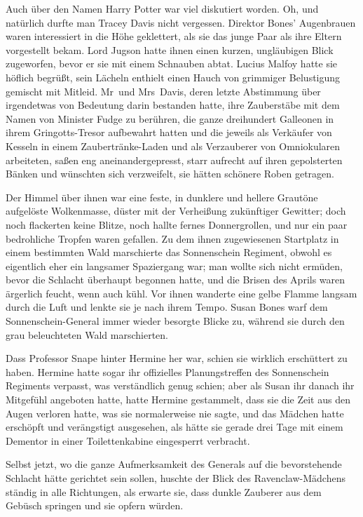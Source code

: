 {Auch über den Namen Harry Potter war viel diskutiert worden. Oh, und natürlich durfte man Tracey Davis nicht vergessen. Direktor Bones' Augenbrauen waren interessiert in die Höhe geklettert, als sie das junge Paar als ihre Eltern vorgestellt bekam. Lord Jugson hatte ihnen einen kurzen, ungläubigen Blick zugeworfen, bevor er sie mit einem Schnauben abtat. Lucius Malfoy hatte sie höflich begrüßt, sein Lächeln enthielt einen Hauch von grimmiger Belustigung gemischt mit Mitleid. Mr~und Mrs~Davis, deren letzte Abstimmung über irgendetwas von Bedeutung darin bestanden hatte, ihre Zauberstäbe mit dem Namen von Minister Fudge zu berühren, die ganze dreihundert Galleonen in ihrem Gringotts-Tresor aufbewahrt hatten und die jeweils als Verkäufer von Kesseln in einem Zaubertränke-Laden und als Verzauberer von Omniokularen arbeiteten, saßen eng aneinandergepresst, starr aufrecht auf ihren gepolsterten Bänken und wünschten sich verzweifelt, sie hätten schönere Roben getragen.

Der Himmel über ihnen war eine feste, in dunklere und hellere Grautöne aufgelöste Wolkenmasse, düster mit der Verheißung zukünftiger Gewitter; doch noch flackerten keine Blitze, noch hallte fernes Donnergrollen, und nur ein paar bedrohliche Tropfen waren gefallen. Zu dem ihnen zugewiesenen Startplatz in einem bestimmten Wald marschierte das Sonnenschein Regiment, obwohl es eigentlich eher ein langsamer Spaziergang war; man wollte sich nicht ermüden, bevor die Schlacht überhaupt begonnen hatte, und die Brisen des Aprils waren ärgerlich feucht, wenn auch kühl. Vor ihnen wanderte eine gelbe Flamme langsam durch die Luft und lenkte sie je nach ihrem Tempo. Susan Bones warf dem Sonnenschein-General immer wieder besorgte Blicke zu, während sie durch den grau beleuchteten Wald marschierten.

Dass Professor Snape hinter Hermine her war, schien sie wirklich erschüttert zu haben. Hermine hatte sogar ihr offizielles Planungstreffen des Sonnenschein Regiments verpasst, was verständlich genug schien; aber als Susan ihr danach ihr Mitgefühl angeboten hatte, hatte Hermine gestammelt, dass sie die Zeit aus den Augen verloren hatte, was sie normalerweise nie sagte, und das Mädchen hatte erschöpft und verängstigt ausgesehen, als hätte sie gerade drei Tage mit einem Dementor in einer Toilettenkabine eingesperrt verbracht.

Selbst jetzt, wo die ganze Aufmerksamkeit des Generals auf die bevorstehende Schlacht hätte gerichtet sein sollen, huschte der Blick des Ravenclaw-Mädchens ständig in alle Richtungen, als erwarte sie, dass dunkle Zauberer aus dem Gebüsch springen und sie opfern würden.

}
